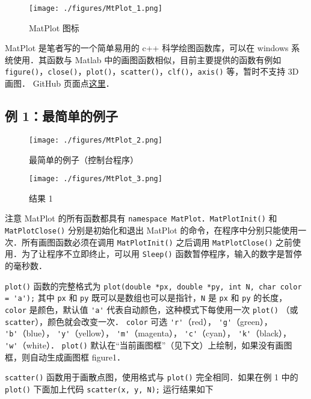 
\begin{figure}[ht]
\centering
\texttt{[image: ./figures/MtPlot\_1.png]}
\caption{MatPlot 图标} \label{MtPlot_fig1}
\end{figure}

MatPlot 是笔者写的一个简单易用的 c++ 科学绘图函数库，可以在 windows 系统使用．其函数与 Matlab 中的画图函数相似，目前主要提供的函数有例如 \verb|figure()|，\verb|close()|，\verb|plot()|，\verb|scatter()|，\verb|clf()|，\verb|axis()| 等，暂时不支持 3D 画图． GitHub 页面点\href{https://github.com/MacroUniverse/MatPlot}{这里}．


\subsection{例 1：最简单的例子}

\begin{figure}[ht]
\centering
\texttt{[image: ./figures/MtPlot\_2.png]}
\caption{最简单的例子（控制台程序）} \label{MtPlot_fig2}
\end{figure}

\begin{figure}[ht]
\centering
\texttt{[image: ./figures/MtPlot\_3.png]}
\caption{结果 1} \label{MtPlot_fig3}
\end{figure}

注意 MatPlot 的所有函数都具有 \verb|namespace MatPlot|．\verb|MatPlotInit()| 和 \verb|MatPlotClose()| 分别是初始化和退出 MatPlot 的命令，在程序中分别只能使用一次．所有画图函数必须在调用 \verb|MatPlotInit()| 之后调用 \verb|MatPlotClose()| 之前使用．为了让程序不立即终止，可以用 \verb|Sleep()| 函数暂停程序，输入的数字是暂停的毫秒数．

\verb|plot()| 函数的完整格式为
\verb|plot(double *px, double *py, int N, char color = 'a');|
其中 \verb|px| 和 \verb|py| 既可以是数组也可以是指针，\verb|N| 是 \verb|px| 和 \verb|py| 的长度，\verb|color| 是颜色，默认值 \verb|'a'| 代表自动颜色，这种模式下每使用一次 \verb|plot()| （或 \verb|scatter|），颜色就会改变一次． \verb|color| 可选 \verb|'r'|（red）， \verb|'g'|（green）， \verb|'b'|（blue）， \verb|'y'|（yellow）， \verb|'m'|（magenta）， \verb|'c'|（cyan）， \verb|'k'|（black）， \verb|'w'|（white）． \verb|plot()| 默认在“当前画图框”（见下文）上绘制，如果没有画图框，则自动生成画图框 figure1．

\verb|scatter()| 函数用于画散点图，使用格式与 \verb|plot()| 完全相同．如果在例 1 中的 \verb|plot()| 下面加上代码
\verb|scatter(x, y, N);|
运行结果如下

